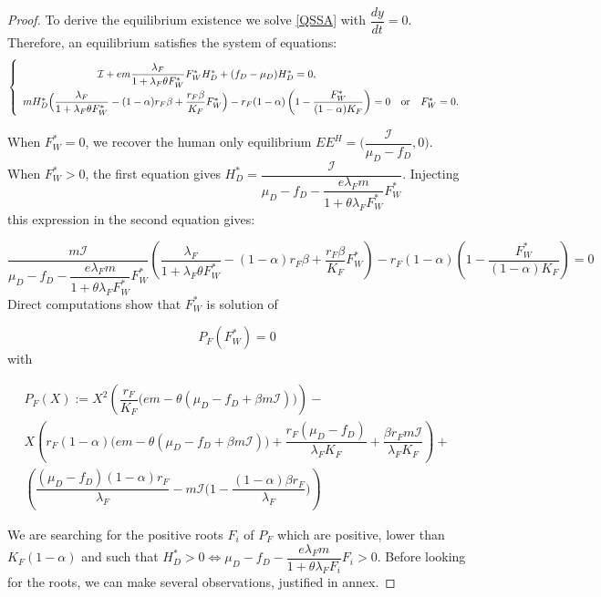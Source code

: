 \documentclass{article}
\newcommand{\lfw}{\lambda_{F}}
\newcommand{\lfw}{\lambda_{F}}
\newcommand{\cI}{\mathcal{I}}
\begin{document}
\begin{proof}
To derive the equilibrium existence we solve \eqref{QSSA} with $\dfrac{d y}{dt} = 0$. Therefore, an equilibrium satisfies the system of equations:
\begin{equation}\label{systemEquilibre}
\left\lbrace \begin{array}{cll}
\def\arraystretch{2}
\cI + e m \dfrac{\lfw}{1 + \lfw \theta F_W^*} F_W^* H_D^* + (f_D - \mu_D) H_D^* = 0,&&\\
m H_D^*\Big(\dfrac{\lfw}{1 + \lfw \theta F_W^*} - (1-\alpha)r_F \beta + \dfrac{r_F \beta}{K_F}F_W^* \Big) - r_F(1-\alpha) \left(1- \dfrac{F_W^*}{(1-\alpha)K_F}\right)= 0& \mbox{or} & F^*_W = 0.
\end{array} \right.
\end{equation}


When $F_W^* = 0$, we recover the human only equilibrium $EE^{H} = \Big(\dfrac{\cI}{\mu_D - f_D},0\Big)$. When $F_W^* > 0$, the first equation gives $H_D^* = \dfrac{\cI}{\mu_D - f_D - \dfrac{e\lfw m }{1 + \theta \lfw F_W^*} F_W^*}$. Injecting this expression in the second equation gives:


\begin{equation*}
\dfrac{m\cI}{\mu_D - f_D - \dfrac{e\lfw m }{1 + \theta \lfw F_W^*} F_W^*}\left(\dfrac{\lfw}{1 + \lfw \theta F_W^*} - (1-\alpha)r_F \beta + \dfrac{r_F \beta}{K_F}F_W^* \right) - r_F(1-\alpha) \left(1- \dfrac{F_W^*}{(1-\alpha)K_F}\right)= 0 
\end{equation*}
Direct computations show that $F_W^*$ is solution of

\begin{equation*}
P_F(F_W^*) = 0
\end{equation*}
with 

\begin{multline}
P_F(X) := X^2 \left(\dfrac{r_F}{K_F} \Big(em - \theta(\mu_D-f_D + \beta m \cI) \Big) \right) - \\ 
X \left(r_F (1-\alpha)   \Big(em - \theta(\mu_D-f_D + \beta m \cI)  \Big) + \dfrac{r_F(\mu_D-f_D)}{\lfw K_F} + \dfrac{\beta r_F m \cI}{\lfw K_F} \right) + \\
 \left(\dfrac{(\mu_D - f_D)(1-\alpha) r_F}{\lfw} - m\cI\Big(1 - \dfrac{(1-\alpha)\beta r_F}{\lfw} \Big) \right)
\end{multline}

We are searching for the positive roots $F_i$ of $P_F$ which are positive, lower than $K_F(1- \alpha)$ and such that $H_D^* > 0 \Leftrightarrow \mu_D - f_D - \dfrac{e\lfw m}{1 + \theta \lfw F_i} F_i > 0$. Before looking for the roots, we can make several observations, justified in annex.


\end{proof}
\end{document}
